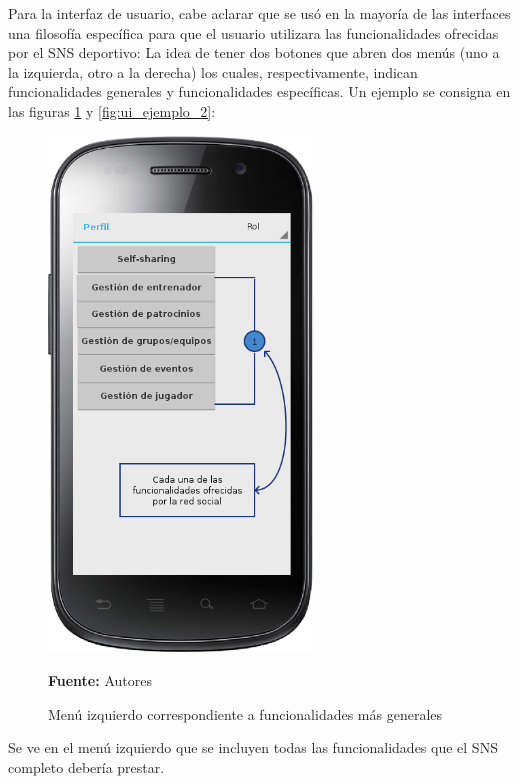 Para la interfaz de usuario, cabe aclarar que se usó en la mayoría de las interfaces una filosofía específica para que el usuario utilizara las funcionalidades ofrecidas por el SNS deportivo: La idea de tener dos botones que abren dos menús (uno a la izquierda, otro a la derecha) los cuales, respectivamente, indican funcionalidades generales y funcionalidades específicas. Un ejemplo se consigna en las figuras \ref{fig:ui_ejemplo_1} y \ref{fig:ui_ejemplo_2}:

\begin{figure}[!htb]
  \begin{center}
    \includegraphics[width=7cm]{./imagenes/UI/Self_sharing/self_sharing_1.png}
    \caption{Menú izquierdo correspondiente a funcionalidades más generales}
    \label{fig:ui_ejemplo_1}
    \textbf{Fuente:}  Autores
  \end{center}
\end{figure}

Se ve en el menú izquierdo que se incluyen todas las funcionalidades que el SNS completo debería prestar.

